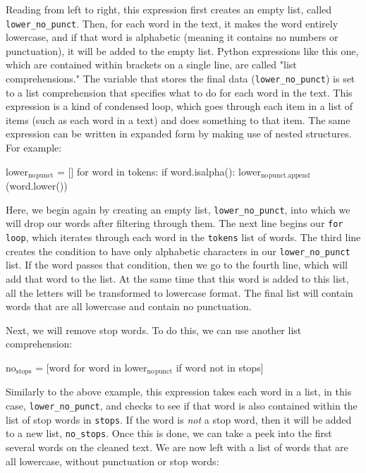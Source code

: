 \documentclass[11pt]{article}
\begin{document}
Reading from left to right, this expression first creates an empty
list, called \texttt{lower\_no\_punct}. Then, for each word in the text, it
makes the word entirely lowercase, and if that word is alphabetic
(meaning it contains no numbers or punctuation), it will be added to
the empty list. Python expressions like this one, which are contained
within brackets on a single line, are called "list comprehensions."
The variable that stores the final data (\texttt{lower\_no\_punct}) is set to a
list comprehension that specifies what to do for each word in the
text. This expression is a kind of condensed loop, which goes through
each item in a list of items (such as each word in a text) and does
something to that item. The same expression can be written in expanded
form by making use of nested structures. For example:

\begin{SOURCE}
lower\(_{\text{no}}\)\(_{\text{punct}}\) = []
for word in tokens:
    if word.isalpha():
        lower\(_{\text{no}}\)\(_{\text{punct.append}}\)(word.lower())
\end{SOURCE}

Here, we begin again by creating an empty list, \texttt{lower\_no\_punct}, into
which we will drop our words after filtering through them. The next
line begins our \texttt{for loop}, which iterates through each word in the
\texttt{tokens} list of words. The third line creates the condition to have
only alphabetic characters in our \texttt{lower\_no\_punct} list. If the word
passes that condition, then we go to the fourth line, which will add
that word to the list. At the same time that this word is added to
this list, all the letters will be transformed to lowercase
format. The final list will contain words that are all lowercase and
contain no punctuation.

Next, we will remove stop words. To do this, we can use another list
comprehension:

\begin{SOURCE}
no\(_{\text{stops}}\) = [word for word in lower\(_{\text{no}}\)\(_{\text{punct}}\) if word not in stops]
\end{SOURCE}

Similarly to the above example, this expression takes each word in a
list, in this case, \texttt{lower\_no\_punct}, and checks to see if that word
is also contained within the list of stop words in \texttt{stops}. If the
word is \emph{not} a stop word, then it will be added to a new list,
\texttt{no\_stops}.  Once this is done, we can take a peek into the first
several words on the cleaned text. We are now left with a list of
words that are all lowercase, without punctuation or stop words:
\end{document}
